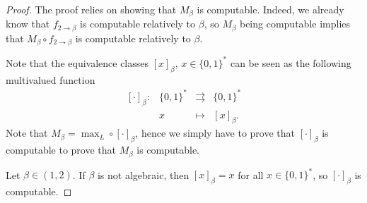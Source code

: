 \begin{proof}
    The proof relies on showing that $M_\beta$ is computable. Indeed, we already know that $f_{2\to \beta}$ is computable relatively to $\beta$, so $M_\beta$ being computable implies that $M_\beta \circ f_{2\to \beta}$ is computable relatively to $\beta$.

    Note that the equivalence classes $[x]_\beta$, $x \in \{0,1\}^\ast$ can be seen as the following multivalued function 
    \begin{equation}\label{eq:definition of equivalence class as a multivalued function:cor:M is computable for algebraic beta}
        \begin{array}{rccc}
            [\cdot]_\beta : &\{0,1\}^\ast &\rightrightarrows &\{0,1\}^\ast\\
            & x & \mapsto & [x]_\beta.
        \end{array}
    \end{equation}
    Note that $M_\beta = \max_L \circ [\cdot]_\beta$, hence we simply have to prove that $[\cdot]_\beta$ is computable to prove that $M_\beta$ is computable.
   
    Let $\beta \in (1,2)$. If $\beta$ is not algebraic, then $[x]_\beta = {x}$ for all $x\in \{0,1\}^\ast$, so $[\cdot]_\beta$ is computable.


\end{proof}
